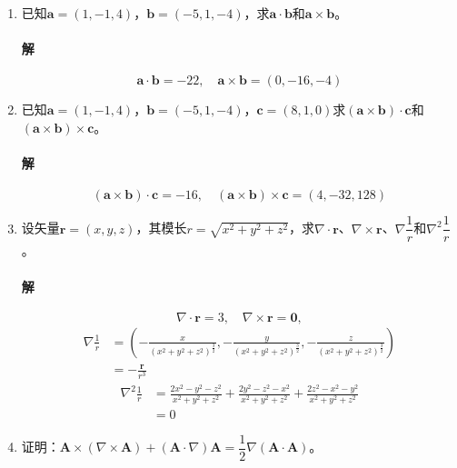 \documentclass[fontset=none,openany,a4paper]{ctexbook}
\begin{document}
\begin{enumerate}

    \item 已知$\bm{a}=(1,-1,4)$，$\bm{b}=(-5,1,-4)$，求$\bm{a}\cdot\bm{b}$和$\bm{a}\times\bm{b}$。

    \paragraph{解}

    \[
    \bm{a} \cdot \bm{b} = -22,\quad \bm{a} \times \bm{b} = (0,-16,-4)
    \]

    \item 已知$\bm{a}=(1,-1,4)$，$\bm{b}=(-5,1,-4)$，$\bm{c}=(8,1,0)$求$(\bm{a}\times\bm{b})\cdot\bm{c}$和$(\bm{a}\times\bm{b})\times\bm{c}$。

    \paragraph{解}

    \[
    (\bm{a}\times\bm{b})\cdot\bm{c} = -16,\quad (\bm{a}\times\bm{b})\times\bm{c} = (4,-32,128)
    \]

    \item 设矢量$\bm{r}=(x,y,z)$，其模长$r=\sqrt{x^2+y^2+z^2}$，求$\nabla\cdot\bm{r}$、$\nabla\times\bm{r}$、$\nabla\dfrac{1}{r}$和$\nabla^2\dfrac{1}{r}$。

    \paragraph{解}

    \[
    \nabla\cdot\bm{r} = 3,\quad \nabla\times\bm{r} = \bm{0},
    \]
    \begin{align*}
        \nabla\frac{1}{r}
        &= (-\frac{x}{(x^2+y^2+z^2)^\tfrac{3}{2}},-\frac{y}{(x^2+y^2+z^2)^\tfrac{3}{2}},-\frac{z}{(x^2+y^2+z^2)^\tfrac{3}{2}}) \\
        &= -\frac{\bm{r}}{r^3}
    \end{align*}
    \begin{align*}
        \nabla^2\frac{1}{r}
        &= \frac{2x^2-y^2-z^2}{x^2+y^2+z^2} + \frac{2y^2-z^2-x^2}{x^2+y^2+z^2} + \frac{2z^2-x^2-y^2}{x^2+y^2+z^2} \\
        &= 0
    \end{align*}

    \item 证明：$\bm{A}\times(\nabla\times\bm{A})+(\bm{A}\cdot\nabla)\bm{A}=\dfrac{1}{2}\nabla(\bm{A}\cdot\bm{A})$。


\end{enumerate}
\end{document}
